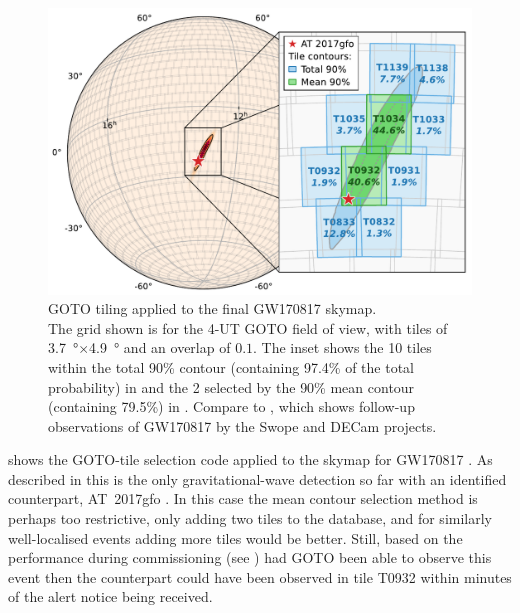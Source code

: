 \begin{colsection}
\begin{colsection}
\newpage

\begin{figure}[t]
    \begin{center}
        \includegraphics[width=\linewidth]{images/tiling/170817.pdf}
    \end{center}
    \caption[GOTO tile probabilities for GW170817]{
        GOTO tiling applied to the final GW170817 skymap. \\
        The grid shown is for the 4-UT GOTO field of view, with tiles of \SI{3.7}{\degree}$\times$\SI{4.9}{\degree} and an overlap of $0.1$. The inset shows the 10 tiles within the total 90\% contour (containing 97.4\% of the total probability) in  and the 2 selected by the 90\% mean contour (containing 79.5\%) in . Compare to , which shows follow-up observations of GW170817 by the Swope and DECam projects.
    }\label{fig:170817_gw}
\end{figure}

 shows the GOTO-tile selection code applied to the skymap for GW170817 \citep{GW170817}. As described in  this is the only gravitational-wave detection so far with an identified counterpart, AT~2017gfo \citep{GW170817_followup}. In this case the mean contour selection method is perhaps too restrictive, only adding two tiles to the database, and for similarly well-localised events adding more tiles would be better. Still, based on the performance during commissioning (see ) had GOTO been able to observe this event then the counterpart could have been observed in tile T0932 within minutes of the alert notice being received.

\end{colsection}


\end{colsection}

